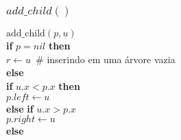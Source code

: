 \documentclass{beamer}
\begin{document}
\begin{frame}[shrink]
\frametitle{$add\_child()$}
\begin{oframed}
\begin{flushleft}
\hspace*{1em} \ensuremath{\mathrm{add\_child}(\ensuremath{\mathit{p}}, \ensuremath{\mathit{u}})}\\
\hspace*{1em} \hspace*{1em} {\color{black} \textbf{if}} \ensuremath{\ensuremath{\mathit{p}} = nil} {\color{black} \textbf{then}} \\
\hspace*{1em} \hspace*{1em} \hspace*{1em} \ensuremath{\ensuremath{\mathit{r}} \gets  \ensuremath{u} }\ {\color{green}\# inserindo em uma árvore vazia}\\
\hspace*{1em} \hspace*{1em} {\color{black} \textbf{else}} \\
\hspace*{1em} \hspace*{1em} \hspace*{1em} {\color{black} \textbf{if}} \ensuremath{\ensuremath{\mathit{u}}.\ensuremath{\mathit{x}} < \ensuremath{\mathit{p}}.x} {\color{black} \textbf{then}} \\
\hspace*{1em} \hspace*{1em} \hspace*{1em} \hspace*{1em} \ensuremath{\ensuremath{\mathit{p}}.\ensuremath{left} \gets  \ensuremath{u}}\\
\hspace*{1em} \hspace*{1em} \hspace*{1em} {\color{black} \textbf{else}} {\color{black} \textbf{if}} \ensuremath{\ensuremath{\mathit{u}}.\ensuremath{\mathit{x}} > \ensuremath{\mathit{p}}.\ensuremath{\mathit{x}}}\\
\hspace*{1em} \hspace*{1em} \hspace*{1em} \hspace*{1em} \ensuremath{\ensuremath{\mathit{p}}.\ensuremath{right} \gets  \ensuremath{u}}\\
\hspace*{1em} \hspace*{1em} \hspace*{1em} {\color{black} \textbf{else}} \\

\end{flushleft}
\end{oframed}
\end{frame}
\end{document}
